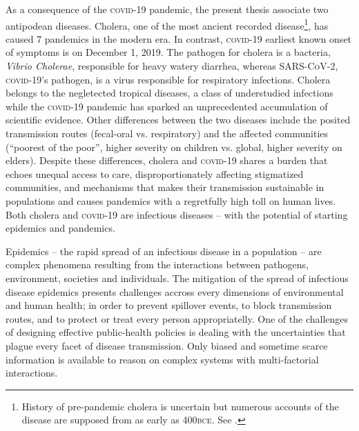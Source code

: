   As a consequence of the \textsc{covid}-19 pandemic, the present thesis associate two antipodean diseases. Cholera, one of the most ancient recorded disease\footnote[][]{History of pre-pandemic cholera is uncertain but numerous accounts of the disease are supposed from as early as 400\textsc{bce}. See .}, has caused 7 pandemics in the modern era. In contrast, \textsc{covid}-19 earliest known onset of symptoms is on December 1, 2019. The pathogen for cholera is a bacteria, \textit{Vibrio Cholerae}, responsible for heavy watery diarrhea, whereas \textsc{SARS-CoV-2}, \textsc{covid}-19’s pathogen, is a virus responsible for respiratory infections. Cholera belongs to the negletected tropical diseases, a class of understudied infections while the \textsc{covid}-19 pandemic has sparked an unprecedented accumulation of scientific evidence. 
Other differences between the two diseases include the posited transmission routes (fecal-oral vs. respiratory) and the affected communities (``poorest of the poor”, higher severity on children vs. global, higher severity on elders). Despite these differences, cholera and \textsc{covid}-19 shares a burden that echoes unequal access to care, disproportionately affecting stigmatized communities, and  mechanisms that makes their transmission sustainable in populations and causes pandemics with a regretfully high toll on human lives. Both cholera and \textsc{covid}-19 are infectious diseases -- with the potential of starting epidemics and pandemics.%

 
Epidemics -- the rapid spread of an infectious disease in a population -- are  complex phenomena resulting from the interactions between pathogens, environment, societies and individuals\cite{Rinaldo:RiverNetworksEcological:2020a, Buckee:ThinkingClearlySocial:2021, Heesterbeek:ModelingInfectiousDisease:2015}. The mitigation of the spread of infectious disease epidemics presents challenges accross every dimensions of environmental and human health; in order to prevent spillover events, to block transmission routes, and to protect or treat every person appropriatelly. %
 One of the challenges of designing effective public-health policies is dealing with the uncertainties that plague every facet of disease transmission. Only biased and sometime scarce information is available to reason on complex systems with multi-factorial interactions. 
 

